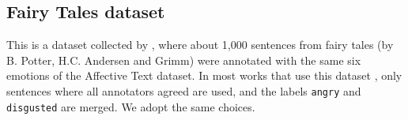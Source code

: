 \documentclass[11pt]{article}
\newcommand{\note}[1]{\textbf{*** #1 ***}}
\begin{document}


\subsection{Fairy Tales dataset}
This is a dataset collected by , where about 1,000 sentences from fairy tales (by B. Potter, H.C. Andersen and Grimm) were annotated with the same six emotions of the Affective Text dataset. In most works that use this dataset \cite{kim2010evaluation,calvo2013emotions,chaffar2011using}, only sentences where all annotators agreed are used, and the labels \texttt{angry} and \texttt{disgusted} are merged. We adopt the same choices. 



 






\end{document}
